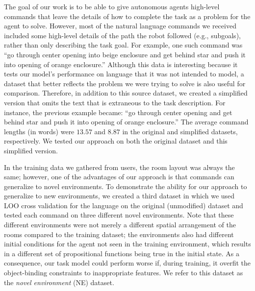 \documentclass[conference]{IEEEtran}
\begin{document}
The goal of our work is to be able to give autonomous agents high-level commands that leave the details of how to complete the task as a problem for the agent to solve. However, most of the natural language commands we received included some high-level details of the path the robot followed (e.g., subgoals), rather than only describing the task goal. 
For example, one such command was ``go through center opening into beige enclosure and get behind star and push it into opening of orange enclosure.'' 
Although this data is interesting because it tests our model's performance on language that it was not intended to model, a dataset that better reflects the problem we were trying to solve is also useful for comparison. Therefore, in addition to this source dataset, we  created a simplified version that omits the text that is extraneous to the task description. 
For instance, the previous example became: ``go through center opening and get behind star and push it into opening of orange enclosure.'' 
The average command lengths (in words) were $13.57$ and $8.87$ in the original and simplified datasets, respectively. We tested our approach on both the original dataset and this simplified version.

In the training data we gathered from users, the room layout was always the same; however, one of the advantages of our approach is that commands can generalize to novel environments. To demonstrate the ability for our approach to generalize to new environments, we created a third dataset in which we used LOO cross validation for the language on the original (unmodified) dataset and tested each command on three different novel environments. Note that these different environments were not merely a different spatial arrangement of the rooms compared to the training dataset; the environments also had different initial conditions for the agent not seen in the training environment, which results in a different set of propositional functions being true in the initial state. As a consequence, our task model could perform worse if, during training, it overfit the object-binding constraints to inappropriate features. We refer to this dataset as the {\em novel environment} (NE) dataset.


\end{document}
